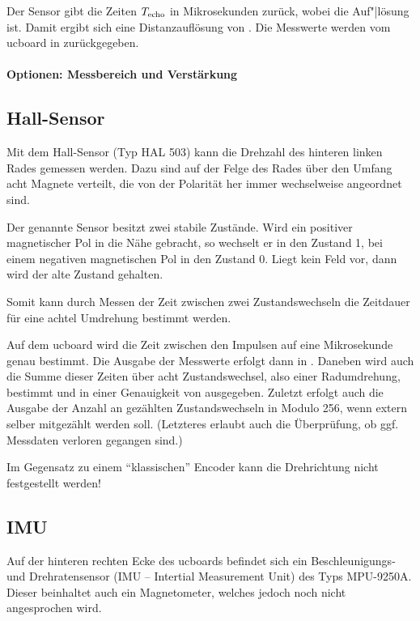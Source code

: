 Der Sensor gibt die Zeiten $T_{\mathrm{echo}}$ in Mikrosekunden zurück, wobei die Auf"|lösung  ist. Damit ergibt sich eine Distanzauflösung von \ca {}. Die Messwerte werden vom ucboard in  zurückgegeben.


\paragraph{Optionen: Messbereich und Verstärkung}



\subsection{Hall-Sensor}

Mit dem Hall-Sensor (Typ HAL 503) kann die Drehzahl des hinteren linken Rades gemessen werden. Dazu sind auf der Felge des Rades über den Umfang acht Magnete verteilt, die von der Polarität her immer wechselweise angeordnet sind.

Der genannte Sensor besitzt zwei stabile Zustände. Wird ein positiver magnetischer Pol in die Nähe gebracht, so wechselt er in den Zustand 1, bei einem negativen magnetischen Pol in den Zustand 0. Liegt kein Feld vor, dann wird der alte Zustand gehalten. 

Somit kann durch Messen der Zeit zwischen zwei Zustandswechseln die Zeitdauer für eine achtel Umdrehung bestimmt werden. 

Auf dem ucboard wird die Zeit zwischen den Impulsen auf eine Mikrosekunde genau bestimmt. Die Ausgabe der Messwerte erfolgt dann in . Daneben wird auch die Summe dieser Zeiten über acht Zustandswechsel, also einer Radumdrehung, bestimmt und in einer Genauigkeit von  ausgegeben. Zuletzt erfolgt auch die Ausgabe der Anzahl an gezählten Zustandswechseln in Modulo 256, wenn extern selber mitgezählt werden soll. (Letzteres erlaubt auch die Überprüfung, ob ggf. Messdaten verloren gegangen sind.)

Im Gegensatz zu einem "`klassischen"' Encoder kann die Drehrichtung nicht festgestellt werden!


\subsection{IMU}

Auf der hinteren rechten Ecke des ucboards befindet sich ein Beschleunigungs- und Drehratensensor (IMU -- Intertial Measurement Unit) des Typs MPU-9250A. \textcolor[rgb]{0.75,0.75,0.75}{Dieser beinhaltet auch ein Magnetometer, welches jedoch noch nicht angesprochen wird.}

